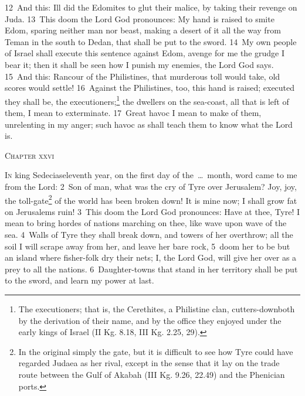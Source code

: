 \documentclass[10pt]{book} %
\begin{document}
\textcolor{benred8}{12}~And this: Ill did the Edomites to glut their malice, by taking their revenge on Juda. \textcolor{benred8}{13}~This doom the Lord God pronounces: My hand is raised to smite Edom, sparing neither man nor beast, making a desert of it all the way from Teman in the south to Dedan, that shall be put to the sword. \textcolor{benred8}{14}~My own people of Israel shall execute this sentence against Edom, avenge for me the grudge I bear it; then it shall be seen how I punish my enemies, the Lord God says.
\textcolor{benred8}{15}~And this: Rancour of the Philistines, that murderous toll would take, old scores would settle! \textcolor{benred8}{16}~Against the Philistines, too, this hand is raised; executed they shall be, the executioners;\footnote[2]{\textasciigrave The executioners\textquotesingle ; that is, the Cerethites, a Philistine clan, \textasciigrave cutters-down\textquotesingle  both by the derivation of their name, and by the office they enjoyed under the early kings of Israel (II Kg. 8.18, III Kg. 2.25, 29).} the dwellers on the sea-coast, all that is left of them, I mean to exterminate. \textcolor{benred8}{17}~Great havoc I mean to make of them, unrelenting in my anger; such havoc as shall teach them to know what the Lord is.
\begin{large}\begin{center}\textsc{Chapter xxvi}\end{center}\end{large}
\lettrine[lines=2]{I}{n} king Sedecias\textquotesingle  eleventh year, on the first day of the~\ldots\  month, word came to me from the Lord: \textcolor{benred8}{2}~Son of man, what was the cry of Tyre over Jerusalem? Joy, joy, the toll-gate\footnote[1]{In the original simply \textasciigrave the gate\textquotesingle , but it is difficult to see how Tyre could have regarded Judaea as her rival, except in the sense that it lay on the trade route between the Gulf of Akabah (III Kg. 9.26, 22.49) and the Phenician ports.} of the world has been broken down! It is mine now; I shall grow fat on Jerusalem\textquotesingle s ruin! \textcolor{benred8}{3}~This doom the Lord God pronounces: Have at thee, Tyre! I mean to bring hordes of nations marching on thee, like wave upon wave of the sea. \textcolor{benred8}{4}~Walls of Tyre they shall break down, and towers of her overthrow; all the soil I will scrape away from her, and leave her bare rock, \textcolor{benred8}{5}~doom her to be but an island where fisher-folk dry their nets; I, the Lord God, will give her over as a prey to all the nations. \textcolor{benred8}{6}~Daughter-towns that stand in her territory shall be put to the sword, and learn my power at last.
\end{document}
